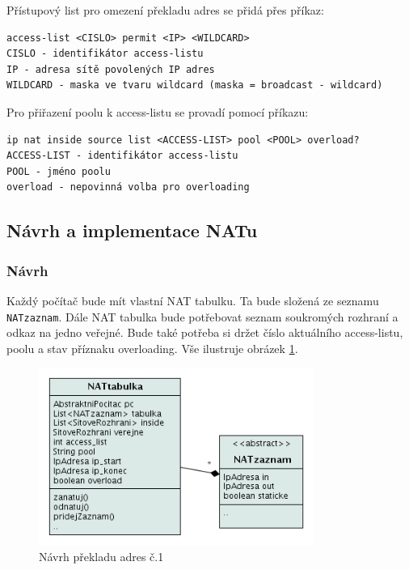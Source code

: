 Přístupový list pro omezení překladu adres se přidá přes příkaz:
\begin{verbatim}
access-list <CISLO> permit <IP> <WILDCARD>
CISLO - identifikátor access-listu
IP - adresa sítě povolených IP adres
WILDCARD - maska ve tvaru wildcard (maska = broadcast - wildcard)
\end{verbatim}

Pro přiřazení poolu k access-listu se provadí pomocí příkazu:
\begin{verbatim}
ip nat inside source list <ACCESS-LIST> pool <POOL> overload?
ACCESS-LIST - identifikátor access-listu
POOL - jméno poolu
overload - nepovinná volba pro overloading
\end{verbatim} 


\subsection{Návrh a implementace NATu}

\subsubsection{Návrh}
Každý počítač bude mít vlastní NAT tabulku. Ta bude složená ze seznamu \verb|NATzaznam|. Dále NAT tabulka bude potřebovat seznam soukromých rozhraní a odkaz na jedno veřejné. Bude také potřeba si držet číslo aktuálního access-listu, poolu a stav příznaku overloading. Vše ilustruje obrázek \ref{fig:nat_navrh1}.

\begin{figure}[h]
\begin{center}
\includegraphics[width=9cm]{figures/nat_navrh1}
\caption{Návrh překladu adres č.1}
\label{fig:nat_navrh1}
\end{center}
\end{figure}

